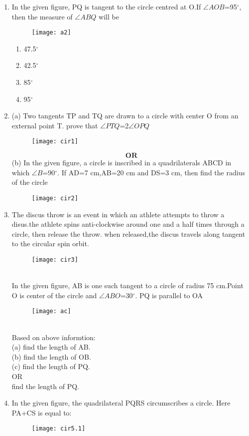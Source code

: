 \documentclass{article}
\newcommand\tab[1][1cm]{\hspace*{#1}}
\begin{document}
\begin{enumerate}
\item In the given figure, PQ is tangent to the circle centred at O.If $\angle{AOB}$=95$^\circ$, then the measure of $\angle{ABQ}$ will be
	\begin{figure}[h]
		\centering
	\texttt{[image: a2]}
\end{figure}
			\begin{enumerate}
		\item 47.5$^\circ$
		\item 42.5$^\circ$
		\item 85$^\circ$
		\item 95$^\circ$
		\end{enumerate}

	\item (a) Two tangents TP and TQ are drawn to a circle with center O from an external point T. prove that $\angle{PTQ}$=2$\angle{OPQ}$
		\begin{figure}[h]
			\centering
			\texttt{[image: cir1]}
		\end{figure}
		$$\textbf{OR}$$
		(b) In the given figure, a circle is inscribed in a quadrilaterals ABCD in which $\angle{B}$=90$^\circ$. If AD=7 cm,AB=20 cm and DS=3 cm, then find the radius of the circle
		\begin{figure}[h]
			\centering
			\texttt{[image: cir2]}
		\end{figure}
	\item The discus throw is an event in which an athlete attempts to throw a disus.the athlete spins anti-clockwise around one and a half times through a circle, then release the throw. when released,the discus travels along tangent to the circular spin orbit.
		\begin{figure}[h]
			\centering
			\texttt{[image: cir3]}
		\end{figure}\\
		In the given figure, AB is one such tangent to a circle of radius 75 cm.Point O is center of the circle and $\angle{ABO}$=30$^\circ$. PQ is parallel to OA
		\begin{figure}[h]
			\centering
			\texttt{[image: ac]}
		\end{figure}\\
		Based on above informtion:\\
		(a) find the length of AB.\\
		(b) find the length of OB.\\
		(c) find the length of PQ.\\
		\tab[2cm]OR\\
		\tab[0.5cm]find the length of PQ.
	\item In the given figure, the quadrilateral PQRS circumscribes a circle. Here PA+CS is equal to:
		\begin{figure}[h]
			\centering
			\texttt{[image: cir5.1]}
		\end{figure}
		

\end{enumerate}
\end{document}
